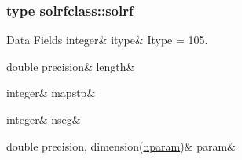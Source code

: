 \subsubsection{type solrfclass\+::solrf}
\begin{DoxyFields}{Data Fields}
\mbox{\label{namespacesolrfclass_af3ec222ea47a2e9d6dea703d94927750}} 
integer&
itype&
Itype = 105. \\
\hline

\mbox{\label{namespacesolrfclass_a6fbb4ce6f8918840cadf9ee8e16769f9}} 
double precision&
length&
\\
\hline

\mbox{\label{namespacesolrfclass_af5533539dedb70fb85e93b1a76a7a55d}} 
integer&
mapstp&
\\
\hline

\mbox{\label{namespacesolrfclass_a1825472ba9b6dfe1d7ca72bfc85f0532}} 
integer&
nseg&
\\
\hline

\mbox{\label{namespacesolrfclass_a10deafd1e7cbd79c86c62766f73105f9}} 
double precision, dimension(\mbox{\hyperlink{namespacesolrfclass_a01b965e25069cff9fb1797fbbcb9939d}{nparam}})&
param&
\\
\hline

\end{DoxyFields}

